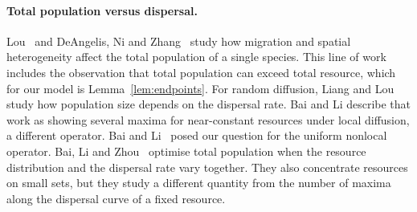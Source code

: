 \documentclass[11pt]{article}
\theoremstyle{remark}
\begin{document}
\paragraph{Total population versus dispersal.}
Lou~\cite{Lou2006} and DeAngelis, Ni and Zhang~\cite{DeAngelisNiZhang2016}
study how migration and spatial heterogeneity affect the total population
of a single species. This line of work includes the observation that
total population can exceed total resource, which for our model is
Lemma~\ref{lem:endpoints}. For random diffusion, Liang and
Lou~\cite{LiangLou2012} study how population size depends on the
dispersal rate. Bai and Li describe that work as showing several maxima
for near-constant resources under local diffusion, a different operator.
Bai and Li~\cite{BaiLi2021} posed our question for the uniform nonlocal
operator. Bai, Li and Zhou~\cite{BaiLiZhou2023} optimise total
population when the resource distribution and the dispersal rate vary
together. They also concentrate resources on small sets, but they study a
different quantity from the number of maxima along the dispersal curve of
a fixed resource.
\end{document}
